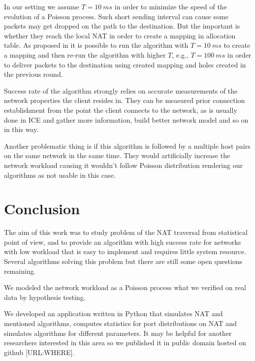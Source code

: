 \documentclass[twoside]{article}
\begin{document}
\begin{multicols}{2}
In our setting we assume $T=10~ms$ in order to minimize the speed of the evolution of a Poisson process.
Such short sending interval can cause some packets may get dropped on the path to the destination. But the 
important is whether they reach the local NAT in order to create a mapping in allocation table. As proposed 
in \citep{Wang:2006:RSN:1156422.1156550} it is possible to run the algorithm with $T=10~ms$ to create a mapping
and then re-run the algorithm with higher $T$, e.g., $T=100~ms$ in order to deliver packets to the destination
using created mapping and holes created in the previous round.

Success rate of the algorithm strongly relies on accurate measurements of the network 
properties the client resides in. They can be measured prior connection establishment 
from the point the client connects to the network, as is usually done in ICE and gather 
more information, build better network model and so on in this way.


Another problematic thing is if this algorithm is followed by a multiple host pairs on
the same network in the same time. They would artificially increase the network workload
causing it wouldn't follow Poisson distribution rendering our algorithms as not usable in
this case.

\section{Conclusion}
The aim of this work was to study problem of the NAT traversal from statistical point of view,
and to provide an algorithm with high success rate for networks with low workload that is easy to 
implement and requires little system resource. 
Several algorithms solving this problem but there are still some open questions remaining. 

We modeled the network workload as a Poisson process what we verified on real data by hypothesis testing.

We developed an application written in Python that simulates NAT and mentioned algorithms, computes
statistics for port distributions on NAT and simulates algorithms for different parameters. It
may be helpful for another researchers interested in this area so we published it in public domain
hosted on github [URL:WHERE].

%



\end{multicols}
\end{document}
